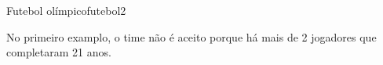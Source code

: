 \documentclass[12pt,a4paper,oneside]{article}
\begin{document}
\begin{problem}{Futebol olímpico}{futebol}{2}
\begin{example}
%
\end{example}

\begin{example}
%
\end{example}




\small
No primeiro examplo, o time não é aceito porque há mais de 2 jogadores que completaram 21 anos.

\end{problem}
\end{document}
